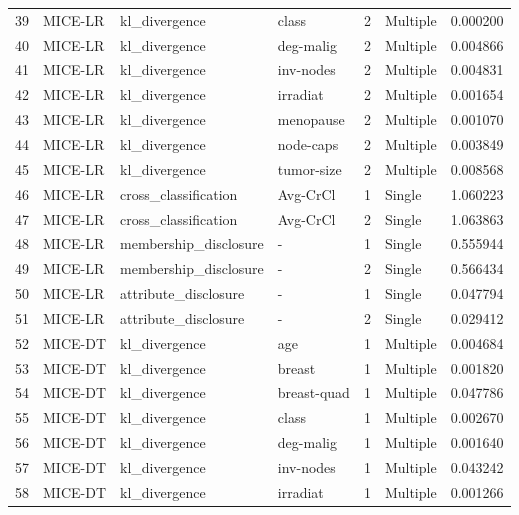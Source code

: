 \begin{tabular}{llllrlr}
39  &  MICE-LR &          kl\_divergence &        class &    2 &  Multiple &  0.000200 \\
40  &  MICE-LR &          kl\_divergence &    deg-malig &    2 &  Multiple &  0.004866 \\
41  &  MICE-LR &          kl\_divergence &    inv-nodes &    2 &  Multiple &  0.004831 \\
42  &  MICE-LR &          kl\_divergence &     irradiat &    2 &  Multiple &  0.001654 \\
43  &  MICE-LR &          kl\_divergence &    menopause &    2 &  Multiple &  0.001070 \\
44  &  MICE-LR &          kl\_divergence &    node-caps &    2 &  Multiple &  0.003849 \\
45  &  MICE-LR &          kl\_divergence &   tumor-size &    2 &  Multiple &  0.008568 \\
46  &  MICE-LR &   cross\_classification &     Avg-CrCl &    1 &    Single &  1.060223 \\
47  &  MICE-LR &   cross\_classification &     Avg-CrCl &    2 &    Single &  1.063863 \\
48  &  MICE-LR &  membership\_disclosure &            - &    1 &    Single &  0.555944 \\
49  &  MICE-LR &  membership\_disclosure &            - &    2 &    Single &  0.566434 \\
50  &  MICE-LR &   attribute\_disclosure &            - &    1 &    Single &  0.047794 \\
51  &  MICE-LR &   attribute\_disclosure &            - &    2 &    Single &  0.029412 \\
52  &  MICE-DT &          kl\_divergence &          age &    1 &  Multiple &  0.004684 \\
53  &  MICE-DT &          kl\_divergence &       breast &    1 &  Multiple &  0.001820 \\
54  &  MICE-DT &          kl\_divergence &  breast-quad &    1 &  Multiple &  0.047786 \\
55  &  MICE-DT &          kl\_divergence &        class &    1 &  Multiple &  0.002670 \\
56  &  MICE-DT &          kl\_divergence &    deg-malig &    1 &  Multiple &  0.001640 \\
57  &  MICE-DT &          kl\_divergence &    inv-nodes &    1 &  Multiple &  0.043242 \\
58  &  MICE-DT &          kl\_divergence &     irradiat &    1 &  Multiple &  0.001266 \\

\end{tabular}
